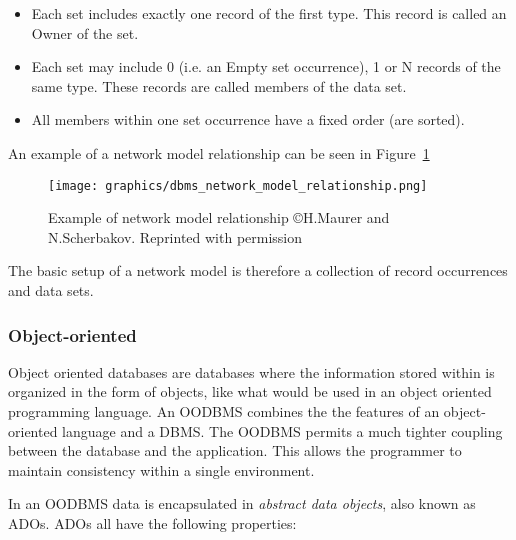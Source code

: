 \documentclass[letterpaper, 12pt]{article}
\begin{document}
\begin{itemize}
  \item Each set includes exactly one record of the first type. This record is called an Owner of the set.
  \item Each set may include 0 (i.e. an Empty set occurrence), 1 or N records of the same type. These records are called members of the data set.
  \item All members within one set occurrence have a fixed order (are sorted).
\end{itemize}
\par\vspace{\baselineskip}
An example of a network model relationship can be seen in Figure~\ref{fig:networkDBMS_relationship}
\begin{figure}
  \centering
  \label{fig:networkDBMS_relationship}
  \texttt{[image: graphics/dbms\_network\_model\_relationship.png]}
  \caption{Example of network model relationship \copyright H.Maurer and N.Scherbakov. Reprinted with permission \cite{network_model_coronet}}
\end{figure}

The basic setup of a network model is therefore a collection of record occurrences and
data sets.

\subsubsection{Object-oriented}
Object oriented databases are databases where the information stored within is organized
in the form of objects, like what would be used in an object oriented programming
language. An OODBMS combines the the features of an object-oriented language and a
DBMS. The OODBMS permits a much tighter coupling between the database and the application. This allows the programmer to maintain consistency within a single environment.
\par\vspace{\baselineskip}
In an OODBMS data is encapsulated in \textit{abstract data objects}, also known
as ADOs. ADOs all have the following properties:
\end{document}
